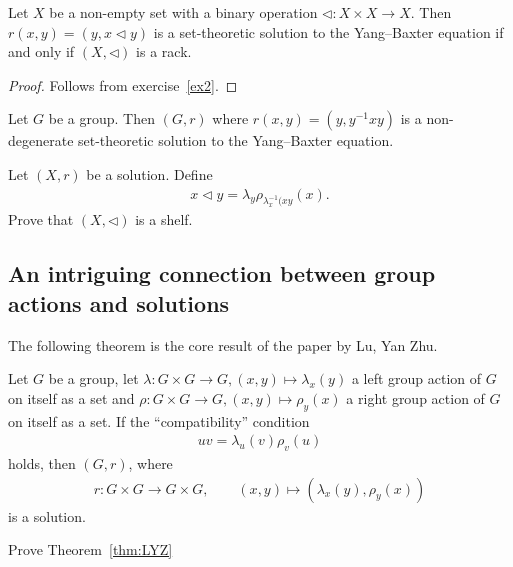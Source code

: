     \begin{proposition}
        Let $X$ be a non-empty set with a binary operation $\triangleleft: X\times X \to X$. Then $r(x,y) =(y,x\triangleleft y)$ is a set-theoretic solution to the Yang--Baxter equation if and only if $(X,\triangleleft)$ is a rack. 
    \end{proposition}

    \begin{proof}
        Follows from exercise~\ref{ex2}.
    \end{proof}

    \begin{exercise}
         Let $G$ be a group. Then $(G,r)$ where $r(x,y)=(y, y^{-1}xy)$ is a 
         non-degenerate set-theoretic solution to the Yang--Baxter equation.
    \end{exercise}

\begin{exercise}
    Let $(X,r)$ be a solution. Define 
    \begin{align*}
        x\triangleleft y = \lambda_y\rho_{\lambda_x^{-1}(xy}(x).
    \end{align*}
    Prove that $(X,\triangleleft)$ is a shelf.
\end{exercise}


\subsection{An intriguing connection between group actions and solutions}
    The following theorem is the core result of the paper \cite{LYZ00} by Lu, Yan Zhu.

    \begin{theorem}\label{thm:LYZ}
         Let $G$ be a group, let $\lambda: G\times G \to G, (x,y)\mapsto \lambda_x(y)$ a left group action of $G$ on itself as a set and $\rho: G\times G \to G, (x,y)\mapsto \rho_y(x)$ a right group action of $G$ on itself as a set. If the ``compatibility'' condition 
        \begin{align}\label{eq:LYZ}
            uv = \lambda_u(v)\rho_v(u)
        \end{align}
        holds, then $(G,r)$, where
        \begin{align*}
            r:G\times G \to G\times G, \qquad (x,y)\mapsto (\lambda_x(y),\rho_y(x))
        \end{align*}
        is a solution.
    \end{theorem}

    \begin{exercise}\label{ex:LYZ}
        Prove Theorem~\ref{thm:LYZ}
    \end{exercise}

